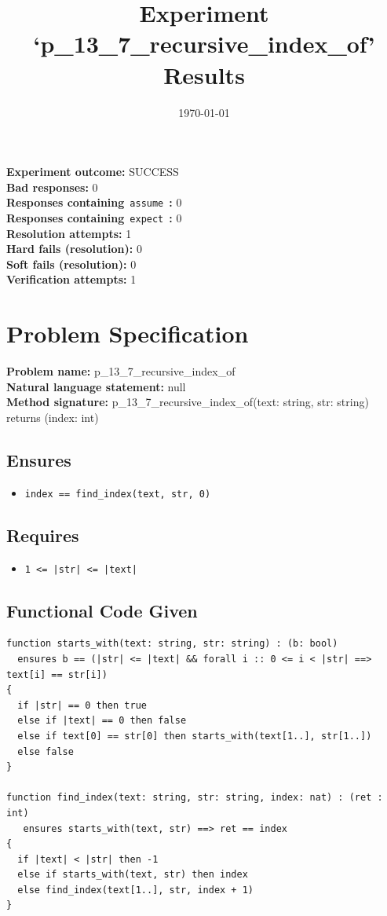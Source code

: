 \documentclass{article}
\begin{document}
\title{Experiment `p\_13\_7\_recursive\_index\_of' Results}
\author{\today}
\date{}
\maketitle
\textbf{Experiment outcome: }SUCCESS
\\\textbf{Bad responses: }0
\\\textbf{Responses containing}~\texttt{assume}~\textbf{: }0
\\\textbf{Responses containing}~\texttt{expect}~\textbf{: }0
\\\textbf{Resolution attempts: }1
\\\textbf{Hard fails (resolution): }0
\\\textbf{Soft fails (resolution): }0
\\\textbf{Verification attempts: }1
\section*{Problem Specification}
\textbf{Problem name: }p\_13\_7\_recursive\_index\_of
\\\textbf{Natural language statement: }null
\\\textbf{Method signature: }p\_13\_7\_recursive\_index\_of(text: string, str: string) returns (index: int)
\subsection*{Ensures}
\begin{itemize}
\item \texttt{index == find\_index(text, str, 0)}
\end{itemize}
\subsection*{Requires}
\begin{itemize}
\item \texttt{1 <= |str| <= |text|}
\end{itemize}
\subsection*{Functional Code Given}
\begin{lstlisting}
function starts_with(text: string, str: string) : (b: bool)
  ensures b == (|str| <= |text| && forall i :: 0 <= i < |str| ==> text[i] == str[i])
{
  if |str| == 0 then true
  else if |text| == 0 then false
  else if text[0] == str[0] then starts_with(text[1..], str[1..])
  else false
}

function find_index(text: string, str: string, index: nat) : (ret : int)
   ensures starts_with(text, str) ==> ret == index 
{
  if |text| < |str| then -1
  else if starts_with(text, str) then index
  else find_index(text[1..], str, index + 1)
}
\end{lstlisting}
\clearpage
\end{document}
